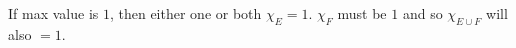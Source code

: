 \documentclass[preview]{standalone}
\begin{document}
\begin{center}
If max value is $1$, then either one or both $\chi_{E} = 1$. $\chi_{F}$ must be $1$ and so $\chi_{E \cup F}$ will also $= 1$.
\end{center}
\end{document}
